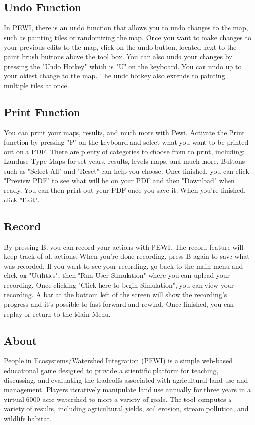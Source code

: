 \documentclass[11pt]{article}
\begin{document}
\subsection{Undo Function}
In PEWI, there is an undo function that allows you to undo changes to the map, such as painting tiles or randomizing the map. Once you want to make changes to your previous edits to the map, click on the undo button, located next to the paint brush buttons above the tool box. You can also undo your changes by pressing the "Undo Hotkey" which is "U" on the keyboard. You can undo up to your oldest change to the map. The undo hotkey also extends to painting multiple tiles at once. 

\subsection{Print Function}
You can print your maps, results, and much more with Pewi. Activate the Print function by pressing "P" on the keyboard and select what you want to be printed out on a PDF. There are plenty of categories to choose from to print, including: Landuse Type Maps for set years, results, levels maps, and much more. Buttons such as "Select All" and "Reset" can help you choose. Once finished, you can click "Preview PDF" to see what will be on your PDF and then "Download" when ready. You can then print out your PDF once you save it. When you're finished, click "Exit". 

\subsection{Record}
By pressing B, you can record your actions with PEWI. The record feature will keep track of all actions. When you're done recording, press B again to save what was recorded. If you want to see your recording, go back to the main menu and click on "Utilities", then "Run User Simulation" where you can upload your recording. Once clicking "Click here to begin Simulation", you can view your recording. A bar at the bottom left of the screen will show the recording's progress and it's possible to fast forward and rewind. Once finished, you can replay or return to the Main Menu. 

\subsection{About}
People in Ecosystems/Watershed Integration (PEWI) is a simple web-based educational game designed to provide a scientific platform for teaching, discussing, and evaluating the tradeoffs associated with agricultural land use and management. Players iteratively manipulate land use annually for three years in a virtual 6000 acre watershed to meet a variety of goals. The tool computes a variety of results, including agricultural yields, soil erosion, stream pollution, and wildlife habitat.
\end{document}
